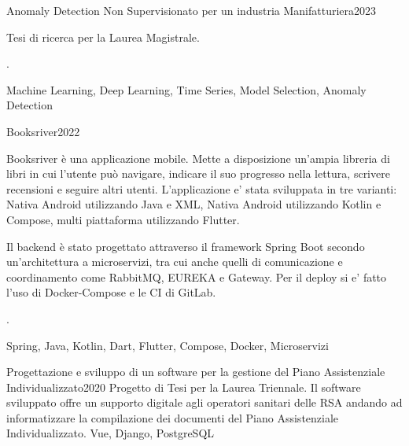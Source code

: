 
\begin{projects}
	\project
	{Anomaly Detection Non Supervisionato per un industria Manifatturiera}{2023}
	{Tesi di ricerca per la Laurea Magistrale. 
		 
		. }
	{Machine Learning, Deep Learning, Time Series, Model Selection, Anomaly Detection}
	
	\project
	{Booksriver}{2022}
	{Booksriver è una applicazione mobile. Mette a disposizione un’ampia libreria di libri in cui l’utente può navigare, indicare il suo progresso nella lettura, scrivere recensioni e seguire altri utenti. L'applicazione e' stata sviluppata in tre varianti: Nativa Android utilizzando Java e XML, Nativa Android utilizzando Kotlin e Compose, multi piattaforma utilizzando Flutter. 
		 
		Il backend è stato progettato attraverso il framework Spring Boot secondo un'architettura a microservizi, tra cui anche quelli di comunicazione e coordinamento come RabbitMQ, EUREKA e Gateway. Per il deploy si e' fatto l'uso di Docker-Compose e le CI di GitLab. 
		 
		. }
	{Spring, Java, Kotlin, Dart, Flutter, Compose, Docker, Microservizi}
	
	 
	\project
	{Progettazione e sviluppo di un software per la gestione del Piano Assistenziale Individualizzato}{2020}
	{Progetto di Tesi per la Laurea Triennale. Il software sviluppato offre un supporto  digitale agli operatori sanitari delle RSA andando ad informatizzare la compilazione dei documenti del Piano Assistenziale Individualizzato.}
	{Vue, Django, PostgreSQL}
					
		
	
	
	
	 
	
\end{projects}